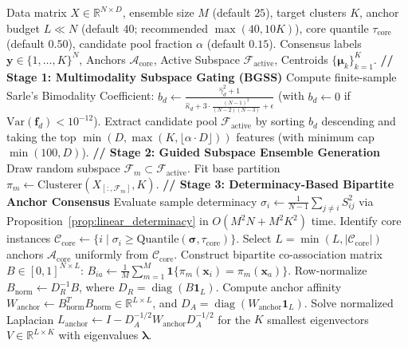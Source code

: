 \documentclass[pdflatex,sn-mathphys-num]{sn-jnl}
\theoremstyle{thmstyleone}
\theoremstyle{thmstyletwo}
\theoremstyle{thmstylethree}
\begin{document}
\begin{algorithm}[!t]
\caption{Gated Anchor Consensus (GAC) Pipeline}
\label{alg:iccv2}
\begin{algorithmic}[1]
\Require Data matrix $X \in \mathbb{R}^{N \times D}$, ensemble size $M$ (default $25$), target clusters $K$, anchor budget $L \ll N$ (default $40$; recommended $\max(40, 10K)$), core quantile $\tau_{\text{core}}$ (default $0.50$), candidate pool fraction $\alpha$ (default $0.15$).
\Ensure Consensus labels $\mathbf{y} \in \{1,\dots,K\}^N$, Anchors $\mathcal{A}_{\text{core}}$, Active Subspace $\mathcal{F}_{\text{active}}$, Centroids $\{\boldsymbol{\mu}_k\}_{k=1}^K$.
\Statex \textbf{// Stage 1: Multimodality Subspace Gating (BGSS)}
 \State Compute finite-sample Sarle's Bimodality Coefficient:
 \State $b_d \leftarrow \frac{\hat{\gamma}_d^2 + 1}{\hat{\kappa}_d + 3 \cdot \frac{(N-1)^2}{(N-2)(N-3)} + \epsilon}$ (with $b_d \leftarrow 0$ if $\mathrm{Var}(\mathbf{f}_d) < 10^{-12}$).
\EndFor
\State Extract candidate pool $\mathcal{F}_{\text{active}}$ by sorting $b_d$ descending and taking the top $\min(D, \max(K, \lfloor \alpha \cdot D \rfloor))$ features (with minimum cap $\min(100, D)$).
\Statex \textbf{// Stage 2: Guided Subspace Ensemble Generation}
 \State Draw random subspace $\mathcal{F}_m \subset \mathcal{F}_{\text{active}}$.
 \State Fit base partition $\pi_m \leftarrow \text{Clusterer}(X_{[:, \mathcal{F}_m]}, K)$.
\EndFor
\Statex \textbf{// Stage 3: Determinacy-Based Bipartite Anchor Consensus}
\State Evaluate sample determinacy $\sigma_i \leftarrow \frac{1}{N-1}\sum_{j \neq i} S_{ij}^2$ via Proposition~\ref{prop:linear_determinacy} in $O(M^2 N + M^2 K^2)$ time.
\State Identify core instances $\mathcal{C}_{\text{core}} \leftarrow \{i \mid \sigma_i \ge \text{Quantile}(\boldsymbol{\sigma}, \tau_{\text{core}})\}$.
\State Select $L = \min(L, |\mathcal{C}_{\text{core}}|)$ anchors $\mathcal{A}_{\text{core}}$ uniformly from $\mathcal{C}_{\text{core}}$.
\State Construct bipartite co-association matrix $B \in [0, 1]^{N \times L}$:
\State $B_{ia} \leftarrow \frac{1}{M}\sum_{m=1}^M \mathbf{1}\{\pi_m(\mathbf{x}_i) = \pi_m(\mathbf{x}_a)\}$.
\State Row-normalize $B_{\text{norm}} \leftarrow D_R^{-1} B$, where $D_R = \operatorname{diag}(B \mathbf{1}_L)$.
\State Compute anchor affinity $W_{\text{anchor}} \leftarrow B_{\text{norm}}^T B_{\text{norm}} \in \mathbb{R}^{L \times L}$, and $D_A = \operatorname{diag}(W_{\text{anchor}} \mathbf{1}_L)$.
\State Solve normalized Laplacian $L_{\text{anchor}} \leftarrow I - D_A^{-1/2} W_{\text{anchor}} D_A^{-1/2}$ for the $K$ smallest eigenvectors $V \in \mathbb{R}^{L \times K}$ with eigenvalues $\boldsymbol{\lambda}$.

\end{algorithmic}
\end{algorithm}
\end{document}

